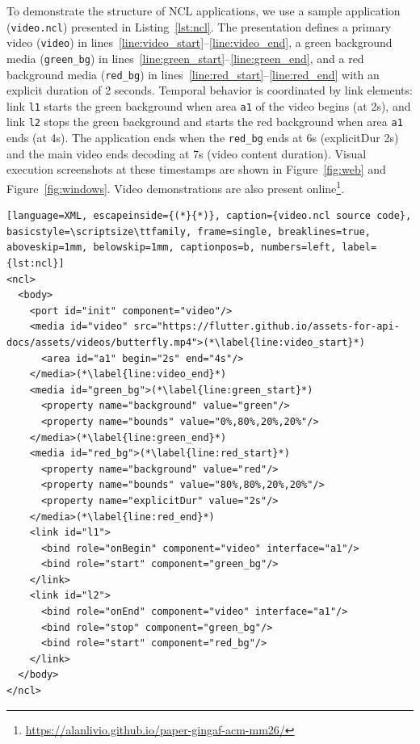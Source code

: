 \documentclass[sigconf,authorversion,review,authordraft]{acmart}
\begin{document}
To demonstrate the structure of NCL applications, we use a sample application (\texttt{video.ncl}) presented in Listing~\ref{lst:ncl}. The presentation defines a primary video (\texttt{video}) in lines~\ref{line:video_start}--\ref{line:video_end}, a green background media (\texttt{green\_bg}) in lines~\ref{line:green_start}--\ref{line:green_end}, and a red background media (\texttt{red\_bg}) in lines~\ref{line:red_start}--\ref{line:red_end} with an explicit duration of 2 seconds. Temporal behavior is coordinated by link elements: link \texttt{l1} starts the green background when area \texttt{a1} of the video begins (at 2s), and link \texttt{l2} stops the green background and starts the red background when area \texttt{a1} ends (at 4s). The application ends when the \texttt{red\_bg} ends at 6s (explicitDur 2s) and the main video ends decoding at 7s (video content duration). Visual execution screenshots at these timestamps are shown in Figure~\ref{fig:web} and Figure~\ref{fig:windows}. Video demonstrations are also present online\footnote{\url{https://alanlivio.github.io/paper-gingaf-acm-mm26/}}.

\begin{lstlisting}[language=XML, escapeinside={(*}{*)}, caption={video.ncl source code}, basicstyle=\scriptsize\ttfamily, frame=single, breaklines=true, aboveskip=1mm, belowskip=1mm, captionpos=b, numbers=left, label={lst:ncl}]
<ncl>
  <body>
    <port id="init" component="video"/>
    <media id="video" src="https://flutter.github.io/assets-for-api-docs/assets/videos/butterfly.mp4">(*\label{line:video_start}*)
      <area id="a1" begin="2s" end="4s"/>
    </media>(*\label{line:video_end}*)
    <media id="green_bg">(*\label{line:green_start}*)
      <property name="background" value="green"/>
      <property name="bounds" value="0%,80%,20%,20%"/>
    </media>(*\label{line:green_end}*)
    <media id="red_bg">(*\label{line:red_start}*)
      <property name="background" value="red"/>
      <property name="bounds" value="80%,80%,20%,20%"/>
      <property name="explicitDur" value="2s"/>
    </media>(*\label{line:red_end}*)
    <link id="l1">
      <bind role="onBegin" component="video" interface="a1"/>
      <bind role="start" component="green_bg"/>
    </link>
    <link id="l2">
      <bind role="onEnd" component="video" interface="a1"/>
      <bind role="stop" component="green_bg"/>
      <bind role="start" component="red_bg"/>
    </link>
  </body>
</ncl>
\end{lstlisting}
\end{document}

